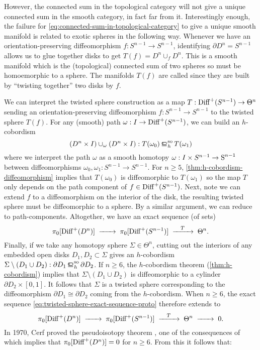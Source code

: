 	However, the connected sum in the topological category will not give a unique connected sum in the smooth category, in fact far from it. Interestingly enough, the failure for \cref{eq:connected-sum-in-topological-category} to give a unique smooth manifold is related to exotic spheres in the following way. Whenever we have an orientation-preserving diffeomorphism $f: S^{n-1}\to S^{n-1}$, identifying $\partial D^n = S^{n-1}$ allows us to glue together disks to get $T(f)=D^n\cup_f D^n$. This is a smooth manifold which is the (topological) connected sum of two spheres so must be homoemorphic to a sphere. The manifolds $T(f)$ are called  since they are built by ``twisting together'' two disks by $f$. 

	We can interpret the twisted sphere construction as a map $T: \op{Diff}^+(S^{n-1})\to \Theta^n$ sending an orientation-preserving diffeomorphism $f : S^{n-1} \to S^{n-1}$ to the twisted sphere $T(f)$. For any (smooth) path $\omega : I \to \op{Diff}^+(S^{n-1})$, we can build an $h$-cobordism 
	\[ (D^n\times I)\cup_\omega (D^n\times I) : T(\omega_0) \sohbord T(\omega_1)\]
	where we interpret the path $\omega$ as a smooth homotopy $\omega : I\times S^{n-1}\to\S^{n-1}$ between diffeomorphisms $\omega_0, \omega_1 : S^{n-1} \to S^{n-1}$. For $n\geq 5$, \cref{thm:h-cobordism-diffeomorphism} implies that $T(\omega_0)$ is diffeomorphic to $T(\omega_1)$ so the map $T$ only depends on the path component of $f\in \op{Diff}^+(S^{n-1})$.
	Next, note we can extend $f$ to a diffeomorphism on the interior of the disk, the resulting twisted sphere must be diffeomorphic to a sphere. By a similar argument, we can reduce to path-components. Altogether, we have an exact sequence (of sets)
	\begin{equation}\label{eq:twisted-sphere-exact-sequence-proto}
		\pi_0 [\op{Diff}^+(D^n)] \lkxto \pi_0 [\op{Diff}^+(S^{n-1})] \lkxto[T] \Theta^n.
	\end{equation}
	Finally, if we take any homotopy sphere $\Sigma\in \Theta^n$, cutting out the interiors of any embedded open disks $D_1, D_2\subset \Sigma$ gives an $h$-cobordism $\Sigma\setminus(D_1\cup D_2) : \partial D_1 \sohbord \partial D_2$. If $n\geq 6$, the $h$-cobordism theorem (\ref{thm:h-cobordism}) implies that $\Sigma \setminus (D_1\cup D_2)$ is diffeomorphic to a cylinder $\partial D_2\times [0,1]$. It follows that $\Sigma$ is a twisted sphere corresponding to the diffeomorphism $\partial D_1 \cong \partial D_2$ coming from the $h$-cobordism.
	When $n\geq 6$, the exact sequence \cref{eq:twisted-sphere-exact-sequence-proto} therefore extends to 
	\[
		\pi_0 [\op{Diff}^+(D^n)] \lkxto \pi_0 [\op{Diff}^+(S^{n-1})] \lkxto[T] \Theta^n \lkxto 0.
	\]
	In 1970, Cerf proved the pseudoisotopy theorem \cite{cerf1970pseudoisotopy}, one of the consequences of which implies that $\pi_0[\op{Diff}^+(D^n)]=0$ for $n\geq 6$. From this it follows that:

